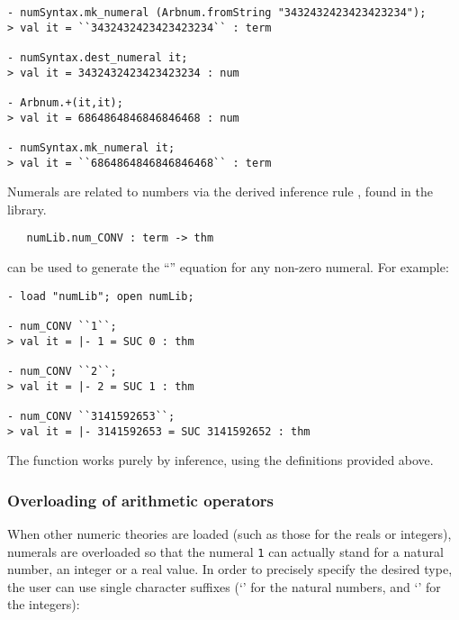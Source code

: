 \setcounter{sessioncount}{0}
\begin{session}
\begin{verbatim}
- numSyntax.mk_numeral (Arbnum.fromString "3432432423423423234");
> val it = ``3432432423423423234`` : term

- numSyntax.dest_numeral it;
> val it = 3432432423423423234 : num

- Arbnum.+(it,it);
> val it = 6864864846846846468 : num

- numSyntax.mk_numeral it;
> val it = ``6864864846846846468`` : term
\end{verbatim}
\end{session}

Numerals are related to numbers via the derived inference rule
, found in the  library.

\begin{boxed}
\begin{verbatim}
   numLib.num_CONV : term -> thm
\end{verbatim}
\end{boxed}

\noindent {} can be used to generate the ``''
equation for any non-zero numeral.  For example:

\setcounter{sessioncount}{0}
\begin{session}
\begin{verbatim}
- load "numLib"; open numLib;

- num_CONV ``1``;
> val it = |- 1 = SUC 0 : thm

- num_CONV ``2``;
> val it = |- 2 = SUC 1 : thm

- num_CONV ``3141592653``;
> val it = |- 3141592653 = SUC 3141592652 : thm
\end{verbatim}
\end{session}

\noindent The  function works purely by inference, using
the definitions provided above.

\subsubsection{Overloading of arithmetic operators}

When other numeric theories are loaded (such as those for the reals or
integers), numerals are overloaded so that the numeral {\small\verb+1+} can
actually stand for a natural number, an integer or a real value.  In
order to precisely specify the desired type, the user can use single
character suffixes (`' for the natural numbers, and `' for
the integers):

